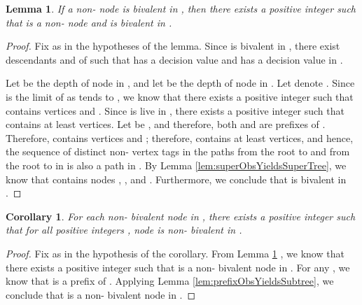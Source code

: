 \documentclass[11pt]{article}
\numberwithin{theorem}{section}
\newtheorem{lemma}[theorem]{Lemma}
\newtheorem{corollary}[theorem]{Corollary}
\begin{document}
\begin{lemma}\label{lem:bivalentNodeFiniteTimeInAllGs}
If a non- node  is bivalent in , then there exists a positive integer  such that  is a non- node and is bivalent in .
\end{lemma}
\begin{proof}
Fix  as in the hypotheses of the lemma. Since  is bivalent in , there exist descendants  and  of  such that  has a decision value  and  has a decision value  in . 

Let  be the depth of node  in , and let  be the depth of node  in . Let  denote . Since  is the limit of  as  tends to , we know that there exists a positive integer  such that  contains vertices  and . Since  is live in , there exists a positive integer  such that  contains at least  vertices. Let  be , and therefore,  both  and  are prefixes of . Therefore,  contains vertices  and ; therefore,  contains at least  vertices, and hence, the sequence of distinct non- vertex tags in the paths from the root to  and from the root to  in  is also a path in . By Lemma \ref{lem:superObsYieldsSuperTree}, we know that  contains nodes , , and . Furthermore, we conclude that  is bivalent in .
\end{proof}

\begin{corollary}\label{cor:bivalentNodeFiniteTimeInAllGs}
For each non- bivalent node  in , there exists a positive integer  such that for all positive integers , node  is non- bivalent in .
\end{corollary}
\begin{proof}
Fix  as in the hypothesis of the corollary. From Lemma \ref{lem:bivalentNodeFiniteTimeInAllGs} , we know that there exists a positive integer  such that  is a non- bivalent node in . For any , we know that 
 is a prefix of .
Applying Lemma \ref{lem:prefixObsYieldsSubtree}, we conclude that  is a non- bivalent node in .
\end{proof}
\end{document}
